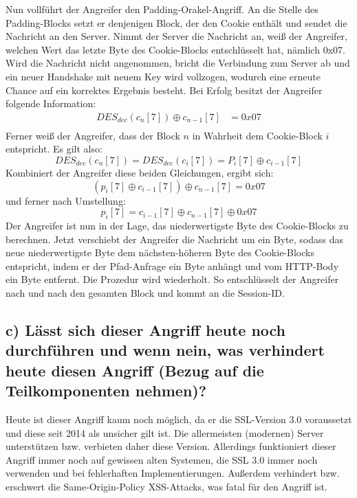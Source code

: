 Nun vollführt der Angreifer den Padding-Orakel-Angriff. An die Stelle des Padding-Blocks setzt er denjenigen Block, der den Cookie enthält und sendet die Nachricht an den Server. Nimmt der Server die Nachricht an, weiß der Angreifer, welchen Wert das letzte Byte des Cookie-Blocks entschlüsselt hat, nämlich 0x07. Wird die Nachricht nicht angenommen, bricht die Verbindung zum Server ab und ein neuer Handshake mit neuem Key wird vollzogen, wodurch eine erneute Chance auf ein korrektes Ergebnis besteht. Bei Erfolg besitzt der Angreifer folgende Information:
$$
\begin{align}
DES_{dec}(c_n[7]) \oplus c_{n-1}[7] &= 0x07 \\
\end{align}
$$
Ferner weiß der Angreifer, dass der Block $n$ in Wahrheit dem Cookie-Block $i$ entspricht. Es gilt also:
$$
DES_{dec}(c_n[7]) = DES_{dec}(c_i[7]) = P_i[7] \oplus c_{i-1}[7]
$$
Kombiniert der Angreifer diese beiden Gleichungen, ergibt sich:
$$
(p_i[7] \oplus c_{i-1}[7]) \oplus c_{n-1}[7] = 0x07
$$
und ferner nach Umstellung:
$$
p_i[7] = c_{i-1}[7] \oplus c_{n-1}[7] \oplus 0x07
$$
Der Angreifer ist nun in der Lage, das niederwertigste Byte des Cookie-Blocks zu berechnen. Jetzt verschiebt der Angreifer die Nachricht um ein Byte, sodass das neue niederwertigste Byte dem nächsten-höheren Byte des Cookie-Blocks entspricht, indem er der Pfad-Anfrage ein Byte anhängt und vom HTTP-Body ein Byte entfernt. Die Prozedur wird wiederholt. So entschlüsselt der Angreifer nach und nach den gesamten Block und kommt an die Session-ID. 

\subsection{c) Lässt sich dieser Angriff heute noch durchführen und wenn nein, was verhindert heute diesen Angriff (Bezug auf die Teilkomponenten nehmen)?}
Heute ist dieser Angriff kaum noch möglich, da er die SSL-Version 3.0 voraussetzt und diese seit 2014 als unsicher gilt ist. Die allermeisten (modernen) Server unterstützen bzw. verbieten daher diese Version. Allerdings funktioniert dieser Angriff immer noch auf gewissen alten Systemen, die SSL 3.0 immer noch verwenden und bei fehlerhaften Implementierungen. Außerdem verhindert bzw. erschwert die Same-Origin-Policy XSS-Attacks, was fatal für den Angriff ist.